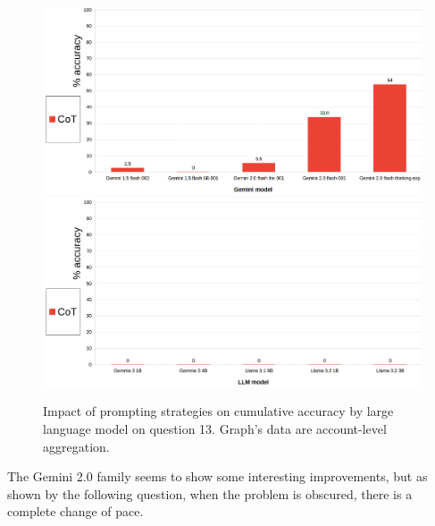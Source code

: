 \documentclass[12pt]{article}
\begin{document}
\begin{figure}[H]
    \centering
            \includegraphics[width=1\textwidth]{q301Gemini.png}
            \includegraphics[width=1\textwidth]{q301Other.png}
    \caption[Accuracy on Question 13 by LLM]{Impact of prompting strategies on cumulative accuracy by large language model on question 13. Graph's data are account-level aggregation.}
    \end{figure} 
The Gemini 2.0 family seems to show some interesting improvements, but as shown by the following question, when the problem is obscured, there is a complete change of pace.\\

\vspace{2cm}

\end{document}

